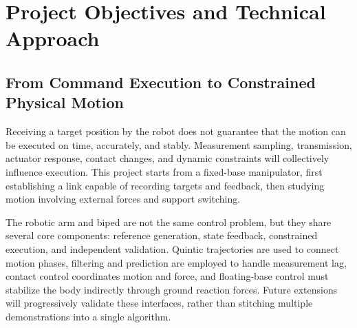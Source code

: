 \chapter{Project Objectives and Technical Approach}
\section{From Command Execution to Constrained Physical Motion}
Receiving a target position by the robot does not guarantee that the motion can be executed on time, accurately, and stably. Measurement sampling, transmission, actuator response, contact changes, and dynamic constraints will collectively influence execution. This project starts from a fixed-base manipulator, first establishing a link capable of recording targets and feedback, then studying motion involving external forces and support switching.

The robotic arm and biped are not the same control problem, but they share several core components: reference generation, state feedback, constrained execution, and independent validation. Quintic trajectories are used to connect motion phases, filtering and prediction are employed to handle measurement lag, contact control coordinates motion and force, and floating-base control must stabilize the body indirectly through ground reaction forces. Future extensions will progressively validate these interfaces, rather than stitching multiple demonstrations into a single algorithm.
